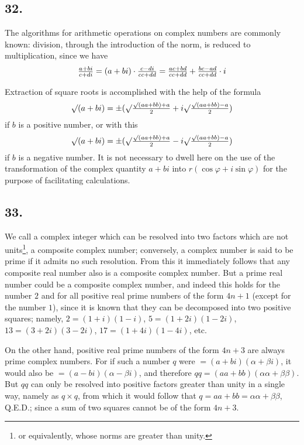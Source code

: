 \documentclass[twoside,12pt]{memoir}
\let\oldfrac\frac
\def\frac#1#2{\mathchoice{\tfrac{#1}{#2}}{\oldfrac{#1}{#2}}{\genfrac{}{}{}{2}{#1}{#2\mathstrut}}{\genfrac{}{}{}{3}{#1}{#2\mathstrut}}}
\begin{document}
\subsection*{32.}
 
The algorithms for arithmetic operations on complex numbers are commonly known: division, through the introduction of the norm, is reduced to multiplication, since we have
\[\frac{a+b i}{c+d i}=(a+b i) \cdot \frac{c-d i}{c c+d d}=\frac{a c+b d}{c c+d d}+\frac{b c-a d}{c c+d d} \cdot i\]
 
Extraction of square roots is accomplished with the help of the formula
\[\surd(a+b i)= \pm(\surd \frac{\surd(a a+b b)+a}{2}+i \surd \frac{\surd(a a+b b)-a}{2})\]
if \(b\) is a positive number, or with this
\[\surd(a+b i)= \pm(\surd \frac{\surd(a a+b b)+a}{2}-i \surd \frac{\surd(a a+b b)-a}{2})\]
if \(b\) is a negative number. It is not necessary to dwell here on the use of the transformation of the complex quantity \(a+b i\) into \(r(\cos \varphi+i \sin \varphi)\) for the purpose of facilitating calculations.

\subsection*{33.}

We call a complex integer which can be resolved into two factors which are not units\footnote{or equivalently, whose norms are greater than unity.}, a composite complex number; conversely, a complex number is said to be prime if it admits no such resolution. From this it immediately follows that any composite real number also is a composite complex number. But a prime real number could be a composite complex number, and indeed this holds for the number \(2\) and for all positive real prime numbers of the form \(4n+1\) (except for the number \(1\)), since it is known that they can be decomposed into two positive squares; namely, \(2=(1+i)(1-i)\), \(5=(1+2i)(1-2i)\), \(13=(3+2i)(3-2i)\), \(17=(1+4i)(1-4i)\), etc{.}

On the other hand, positive real prime numbers of the form \(4n+3\) are always prime complex numbers. For if such a number \(q\) were \(=(a+bi)(\alpha+\beta i)\), it would also be \(=(a-bi)(\alpha-\beta i)\), and therefore \(qq=(a a+b b)(\alpha \alpha+\beta \beta)\). But \(qq\) can only be resolved into positive factors greater than unity in a single way, namely as \(q\times q\), from which it would follow that \(q=a a+b b=\alpha \alpha+\beta \beta\), Q.E.D.; since a sum of two squares cannot be of the form \(4n+3\).\pagebreak%
\end{document}
